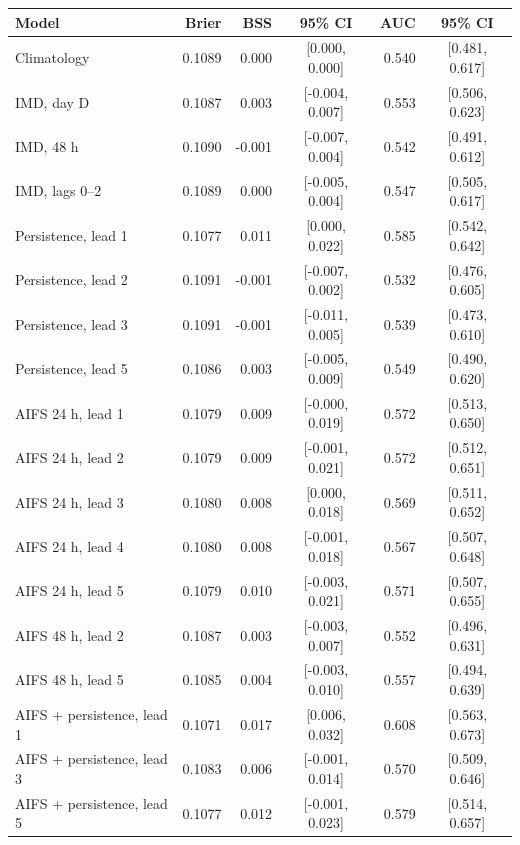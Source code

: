 \begin{tabular}{lrrcrc}\toprule
Model & Brier & BSS & 95\% CI & AUC & 95\% CI \\ \midrule
Climatology & 0.1089 & 0.000 & [0.000, 0.000] & 0.540 & [0.481, 0.617] \\
IMD, day D & 0.1087 & 0.003 & [-0.004, 0.007] & 0.553 & [0.506, 0.623] \\
IMD, 48 h & 0.1090 & -0.001 & [-0.007, 0.004] & 0.542 & [0.491, 0.612] \\
IMD, lags 0--2 & 0.1089 & 0.000 & [-0.005, 0.004] & 0.547 & [0.505, 0.617] \\
\midrule
Persistence, lead 1 & 0.1077 & 0.011 & [0.000, 0.022] & 0.585 & [0.542, 0.642] \\
Persistence, lead 2 & 0.1091 & -0.001 & [-0.007, 0.002] & 0.532 & [0.476, 0.605] \\
Persistence, lead 3 & 0.1091 & -0.001 & [-0.011, 0.005] & 0.539 & [0.473, 0.610] \\
Persistence, lead 5 & 0.1086 & 0.003 & [-0.005, 0.009] & 0.549 & [0.490, 0.620] \\
\midrule
AIFS 24 h, lead 1 & 0.1079 & 0.009 & [-0.000, 0.019] & 0.572 & [0.513, 0.650] \\
AIFS 24 h, lead 2 & 0.1079 & 0.009 & [-0.001, 0.021] & 0.572 & [0.512, 0.651] \\
AIFS 24 h, lead 3 & 0.1080 & 0.008 & [0.000, 0.018] & 0.569 & [0.511, 0.652] \\
AIFS 24 h, lead 4 & 0.1080 & 0.008 & [-0.001, 0.018] & 0.567 & [0.507, 0.648] \\
AIFS 24 h, lead 5 & 0.1079 & 0.010 & [-0.003, 0.021] & 0.571 & [0.507, 0.655] \\
\midrule
AIFS 48 h, lead 2 & 0.1087 & 0.003 & [-0.003, 0.007] & 0.552 & [0.496, 0.631] \\
AIFS 48 h, lead 5 & 0.1085 & 0.004 & [-0.003, 0.010] & 0.557 & [0.494, 0.639] \\
\midrule
AIFS + persistence, lead 1 & 0.1071 & 0.017 & [0.006, 0.032] & 0.608 & [0.563, 0.673] \\
AIFS + persistence, lead 3 & 0.1083 & 0.006 & [-0.001, 0.014] & 0.570 & [0.509, 0.646] \\
AIFS + persistence, lead 5 & 0.1077 & 0.012 & [-0.001, 0.023] & 0.579 & [0.514, 0.657] \\
\bottomrule\end{tabular}